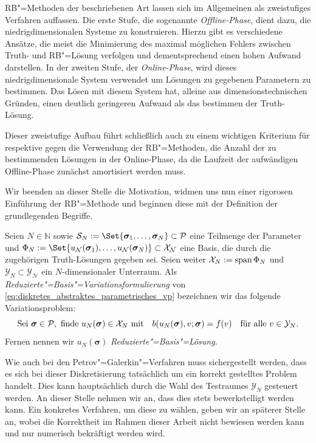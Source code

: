 \documentclass[../main.tex]{subfiles}
\begin{document}
RB"=Methoden der beschriebenen Art lassen sich im Allgemeinen als zweistufiges Verfahren auffassen.
Die erste Stufe, die sogenannte \emph{Offline-Phase}, dient dazu, die niedrigdimensionalen Systeme zu konstruieren.
Hierzu gibt es verschiedene Ansätze, die meist die Minimierung des maximal möglichen Fehlers zwischen Truth- und RB"=Lösung verfolgen und dementsprechend einen hohen Aufwand darstellen.
In der zweiten Stufe, der \emph{Online-Phase}, wird dieses niedrigdimensionale System verwendet um Lösungen zu gegebenen Parametern zu bestimmen.
Das Lösen mit diesem System hat, alleine aus dimensionstechnischen Gründen, einen deutlich geringeren Aufwand als das bestimmen der Truth-Lösung.

Dieser zweistufige Aufbau führt schließlich auch zu einem wichtigen Kriterium für respektive gegen die Verwendung der RB"=Methoden, die Anzahl der zu bestimmenden Lösungen in der Online-Phase, da die Laufzeit der aufwändigen Offline-Phase zunächst amortisiert werden muss.

Wir beenden an dieser Stelle die Motivation, widmen uns nun einer rigorosen Einführung der RB"=Methode und beginnen diese mit der Definition der grundlegenden Begriffe.

\begin{Definition}
\label{definition:rb_variationsproblem}
    Seien $N \in \mathbb{N}$ sowie $\mathcal S_{N} := \Set{ \bm \sigma_{1}, \dots, \bm \sigma_{N} } \subset \mathcal P$ eine Teilmenge der Parameter und $\Phi_{N} := \Set{ u_{\mathcal N}(\bm \sigma_{1}), \dots, u_{\mathcal N}(\bm \sigma_{N})} \subset \mathcal X_{\mathcal N}$ eine Basis, die durch die zugehörigen Truth-Lösungen gegeben sei.
    Seien weiter $\mathcal X_{N} := \operatorname{span} \Phi_{N}$ und $\mathcal Y_{N} \subset \mathcal Y_{\mathcal N}$ ein $N$-dimensionaler Unterraum.
    Als \emph{Reduzierte"=Basis"=Variationsformulierung} von \cref{eq:diskretes_abstraktes_parametrisches_vp} bezeichnen wir das folgende Variationsproblem:
    \begin{equation}
    \label{eq:rb_abstraktes_parametriches_vp}
        \text{Sei } \bm \sigma \in \mathcal P, \text{ finde } u_{N}(\bm \sigma) \in \mathcal X_{N} \text{ mit} \quad b(u_{N}(\bm \sigma), v; \bm \sigma) = f(v) \quad \fa v \in \mathcal Y_{N}.
    \end{equation}
    Fernen nennen wir $u_{N}(\bm \sigma)$ \emph{Reduzierte"=Basis"=Lösung}.
\end{Definition}

Wie auch bei den Petrov"=Galerkin"=Verfahren muss sichergestellt werden, dass es sich bei dieser Diskretisierung tatsächlich um ein korrekt gestelltes Problem handelt.
Dies kann hauptsächlich durch die Wahl des Testraumes $\mathcal Y_{N}$ gesteuert werden.
An dieser Stelle nehmen wir an, dass dies stets bewerkstelligt werden kann.
Ein konkretes Verfahren, um diese zu wählen, geben wir an späterer Stelle an, wobei die Korrektheit im Rahmen dieser Arbeit nicht bewiesen werden kann und nur numerisch bekräftigt werden wird.
\end{document}
